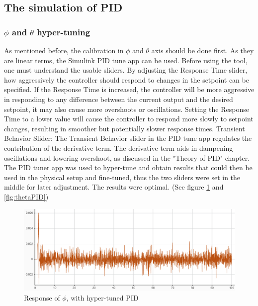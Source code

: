 \subsection{The simulation of PID}

\subsubsection{$\phi$ and $\theta$ hyper-tuning}
As mentioned before, the calibration in $\phi$ and $\theta$ axis should be done first. As they are linear terms, the Simulink PID tune app can be used. Before using the tool, one must understand the usable sliders.  
By adjusting the Response Time slider, how aggressively the controller should respond to changes in the setpoint can be specified. If the Response Time is increased, the controller will be more aggressive in responding to any difference between the current output and the desired setpoint, it may also cause more overshoots or oscillations. Setting the Response Time to a lower value will cause the controller to respond more slowly to setpoint changes, resulting in smoother but potentially slower response times.
Transient Behavior Slider:
The Transient Behavior slider in the PID tune app regulates the contribution of the derivative term. The derivative term aids in dampening oscillations and lowering overshoot, as discussed in the "Theory of PID" chapter.
The PID tuner app was used to hyper-tune and obtain results that could then be used in the physical setup and fine-tuned, thus the two sliders were set in the middle for later adjustment.
The results were optimal. (See figure \ref{fig:phiPID} and \ref{fig:thetaPID})
\begin{figure}[H]
    \begin{center}
    \includegraphics[scale=0.7]{pictures/control/phiPID.PNG}
    \end{center}
    \caption{Response of $\phi$, with hyper-tuned PID}
    \label{fig:phiPID}
\end{figure}

